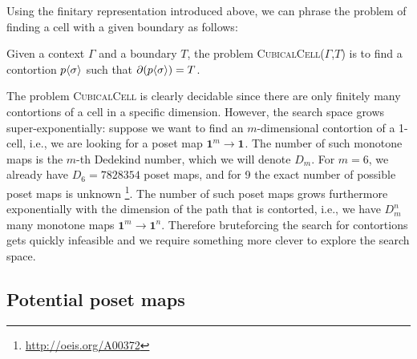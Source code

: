 \documentclass{llncs}
\newcommand{\myproblem}[1]{\textsc{{#1}}}
\newcommand{\pint}[1]{\mathbf{1}^{#1}}
\newcommand{\pintrestr}[3]{\mathbf{1}^{#1}_{{#2}={#3}}}
\newcommand{\restrict}[2]{{#1}|_{#2}}
\renewcommand{\dim}[1]{\mathsf{dim}({#1})}
\newcommand{\ctxtdim}[1]{|{#1}|}
\newcommand{\dmap}[2]{d^{({#1} , {#2})}}
\newcommand{\cont}[2]{\ensuremath{ \ifthenelse{\equal{#2}{}}{#1}{{#1}\langle{#2}\rangle}} }
\newcommand{\boundary}[1]{\partial({#1})}
\begin{document}
Using the finitary representation introduced above, we can phrase the problem of
finding a cell with a given boundary as follows:

\begin{definition}
  Given a context $\Gamma$ and a boundary $T$, the problem
  \myproblem{CubicalCell}($\Gamma$,$T$) is to find a contortion $\cont{p}{\sigma}$ such that
  $\boundary{\cont{p}{\sigma}} = T$.
\end{definition}

The problem \myproblem{CubicalCell} is clearly decidable since there are
only finitely many contortions of a cell in a specific dimension. However, the
search space grows super-exponentially: suppose we want to find an
$m$-dimensional contortion of a 1-cell, i.e., we are looking for a poset map
$\pint{m} \to \pint{}$. The number of such monotone maps is the $m$-th Dedekind
number, which we will denote $D_m$. For $m = 6$, we already have $D_6 = 7828354$
poset maps, and for 9 the exact number of possible poset maps is unknown
\footnote{\url{http://oeis.org/A00372}}. The number of such poset maps grows
furthermore exponentially with the dimension of the path that is contorted,
i.e., we have $D_m^n$ many monotone maps $\pint{m} \to \pint{n}$. 
Therefore bruteforcing the search for contortions gets quickly infeasible and we
require something more clever to explore the search space.







\subsection{Potential poset maps}
\label{ssec:ppm}
\end{document}
